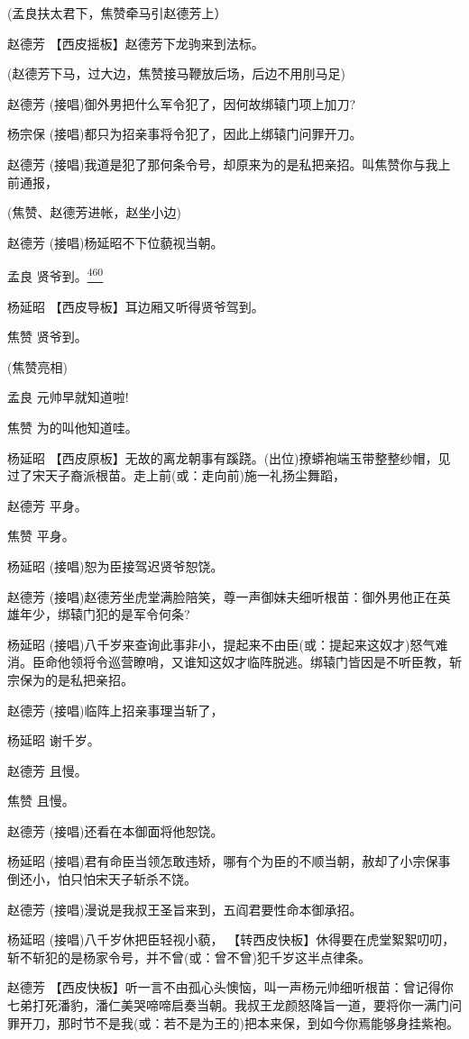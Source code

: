 (孟良扶太君下，焦赞牵马引赵德芳上）

赵德芳 【西皮摇板】赵德芳下龙驹来到法标。

(赵德芳下马，过大边，焦赞接马鞭放后场，后边不用刖马足)

赵德芳 (接唱)御外男把什么军令犯了，因何故绑辕门项上加刀?

杨宗保 (接唱)都只为招亲事将令犯了，因此上绑辕门问罪开刀。

赵德芳
(接唱)我道是犯了那何条令号，却原来为的是私把亲招。叫焦赞你与我上前通报，

(焦赞、赵德芳进帐，赵坐小边)

赵德芳 (接唱)杨延昭不下位藐视当朝。

孟良 贤爷到。\protect\hyperlink{fn460}{\textsuperscript{460}}

杨延昭 【西皮导板】耳边厢又听得贤爷驾到。

焦赞 贤爷到。

(焦赞亮相)

孟良 元帅早就知道啦!

焦赞 为的叫他知道哇。

杨延昭
【西皮原板】无故的离龙朝事有蹊跷。(出位)撩蟒袍端玉带整整纱帽，见过了宋天子裔派根苗。走上前(或：走向前)施一礼扬尘舞蹈，

赵德芳 平身。

焦赞 平身。

杨延昭 (接唱)恕为臣接驾迟贤爷恕饶。

赵德芳
(接唱)赵德芳坐虎堂满脸陪笑，尊一声御妹夫细听根苗：御外男他正在英雄年少，绑辕门犯的是军令何条?

杨延昭
(接唱)八千岁来查询此事非小，提起来不由臣(或：提起来这奴才)怒气难消。臣命他领将令巡营瞭哨，又谁知这奴才临阵脱逃。绑辕门皆因是不听臣教，斩宗保为的是私把亲招。

赵德芳 (接唱)临阵上招亲事理当斩了，

杨延昭 谢千岁。

赵德芳 且慢。

焦赞 且慢。

赵德芳 (接唱)还看在本御面将他恕饶。

杨延昭
(接唱)君有命臣当领怎敢违矫，哪有个为臣的不顺当朝，赦却了小宗保事倒还小，怕只怕宋天子斩杀不饶。

赵德芳 (接唱)漫说是我叔王圣旨来到，五阎君要性命本御承招。

杨延昭 (接唱)八千岁休把臣轻视小藐，
【转西皮快板】休得要在虎堂絮絮叨叨，斩不斩犯的是杨家令号，并不曾(或：曾不曾)犯千岁这半点律条。

赵德芳
【西皮快板】听一言不由孤心头懊恼，叫一声杨元帅细听根苗：曾记得你七弟打死潘豹，潘仁美哭啼啼启奏当朝。我叔王龙颜怒降旨一道，要将你一满门问罪开刀，那时节不是我(或：若不是为王的)把本来保，到如今你焉能够身挂紫袍。

